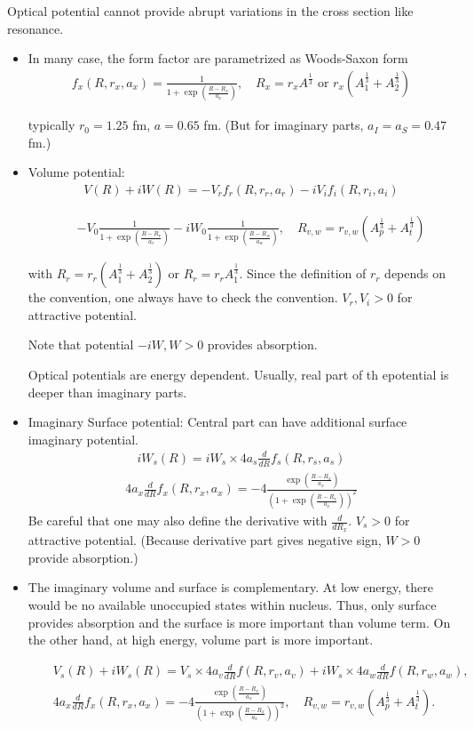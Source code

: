 \documentclass[11pt]{book}
\newcommand{\bea}{\begin{eqnarray}}
\newcommand{\eea}{\end{eqnarray}}
\newcommand{\no}{\nonumber \\}
\begin{document}
Optical potential cannot provide abrupt variations in the cross section 
like resonance. 

\begin{itemize}
\item In many case, the form factor are parametrized as Woods-Saxon form
\bea 
f_x(R,r_x,a_x)=\frac{1}{1+\exp(\frac{R-R_x}{a_x})}  ,\quad R_x=r_x A^{\frac{1}{3}}
 \mbox{ or } r_x (A^{\frac{1}{3}}_1+A^{\frac{1}{3}}_2)
\eea 

typically $r_0=1.25$ fm, $a=0.65$ fm. (But for imaginary parts, $a_I=a_S=0.47$ fm.)

\item Volume potential:
\bea 
V(R)+iW(R)=- V_r f_r(R,r_{r},a_{r})-iV_i f_i(R,r_i,a_i)
\eea 

\bea 
& & - V_0 \frac{1}{1+\exp(\frac{R-R_v}{a_v})} - i W_0 \frac{1}{1+\exp(\frac{R-R_w}{a_w})},
\quad  R_{v,w} = r_{v,w}(A_p^{\frac{1}{3}}+A_t^{\frac{1}{3}}) 
\eea 


with $R_r=r_r(A_1^{\frac{1}{3}}+A_2^{\frac{1}{3}})$ or $R_r=r_r A_1^{\frac{1}{3}}$.
Since the definition of $r_r$ depends on the convention, one always have to 
check the convention.
$V_r,V_i >0$ for attractive potential.


Note that potential $-i W, W>0$ provides absorption. 


Optical potentials are energy dependent. Usually, real part of th epotential
is deeper than imaginary parts. 


\item Imaginary Surface potential: Central part can have additional
     surface imaginary potential.
\bea 
i W_s(R)= i W_s\times 4 a_s \frac{d}{dR} f_s(R,r_s,a_s)
\eea 
\bea 
4 a_x \frac{d}{dR} f_x(R,r_x,a_x)= -4 \frac{\exp(\frac{R-R_x}{a_x})}{(1+\exp(\frac{R-R_x}{a_x}))^2}
\eea 
Be careful that one may also define the derivative with $\frac{d}{dR_x}$. 
$V_s >0$ for attractive potential. (Because derivative part gives negative sign, $W>0$
provide absorption.)

\item The imaginary volume and surface is complementary. 
   At low energy, there would be no available unoccupied states within nucleus. 
   Thus, only surface provides absorption and the surface is more important 
   than volume term. 
   On the other hand, at high energy, volume part is more important.  

\bea 
& &V_s(R)+i W_s(R)=   V_s\times 4 a_v \frac{d}{dR} f(R,r_v,a_v)
                +i W_s\times 4 a_w \frac{d}{dR} f(R,r_w,a_w),\no 
& &               4 a_x \frac{d}{dR} f_x(R,r_x,a_x)= -4 \frac{\exp(\frac{R-R_x}{a_x})}{(1+\exp(\frac{R-R_x}{a_x}))^2}, 
\quad R_{v,w} = r_{v,w}(A_p^{\frac{1}{3}}+A_t^{\frac{1}{3}}) . \nonumber 
\eea 


\end{itemize}
\end{document}
